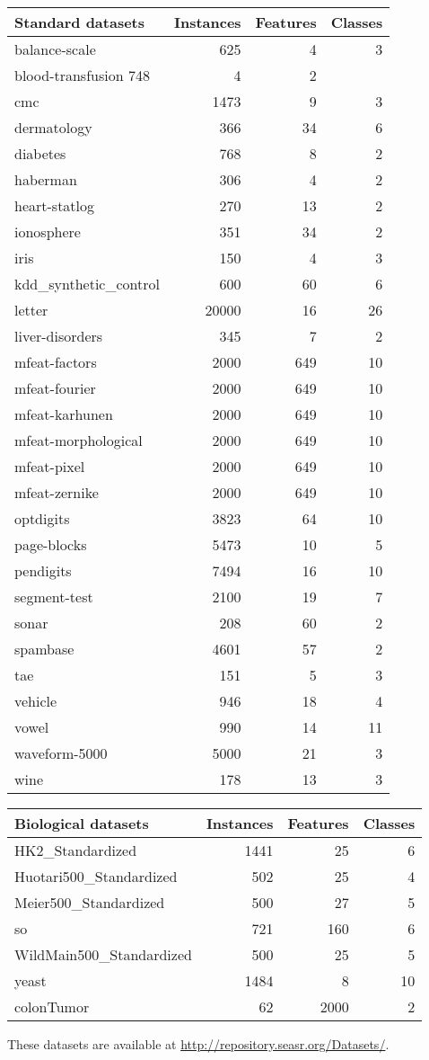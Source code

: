 \begin{tabularx}{\textwidth}{X r r r}
\bf Standard datasets& \bf Instances & \bf Features & \bf Classes\\
\hline

balance-scale & 625 & 4 & 3\\
blood-transfusion  748 & 4 & 2\\
cmc & 1473 & 9 & 3\\
dermatology & 366 & 34 & 6 \\
diabetes & 768 & 8 & 2\\
haberman & 306 & 4 & 2\\
heart-statlog & 270 & 13 & 2 \\
ionosphere & 351 & 34 & 2\\
iris & 150 & 4 & 3\\
kdd\_synthetic\_control & 600 & 60 & 6\\
letter & 20000 & 16 & 26\\
liver-disorders & 345 & 7 & 2 \\
mfeat-factors & 2000 & 649 & 10 \\
mfeat-fourier & 2000 & 649 & 10 \\
mfeat-karhunen & 2000 & 649 & 10 \\
mfeat-morphological  & 2000 & 649 & 10 \\
mfeat-pixel & 2000 & 649 & 10 \\
mfeat-zernike  & 2000 & 649 & 10 \\
optdigits & 3823 & 64 & 10 \\
page-blocks & 5473 & 10 & 5 \\
pendigits & 7494 & 16 & 10 \\
segment-test & 2100 & 19 & 7\\
sonar & 208 & 60 & 2\\
spambase & 4601 & 57 & 2\\
tae & 151 & 5 & 3 \\
vehicle & 946 & 18 & 4\\
vowel & 990 & 14 & 11 \\
waveform-5000 & 5000 & 21 & 3\\
wine & 178 & 13 & 3 \\
\end{tabularx}
\clearpage

\begin{tabularx}{\textwidth}{X r r r}
\bf Biological datasets& \bf Instances & \bf Features & \bf Classes\\
\hline
HK2\_Standardized & 1441 & 25 & 6 \\
Huotari500\_Standardized & 502 & 25 & 4 \\
Meier500\_Standardized & 500 & 27 & 5 \\
so & 721 & 160 & 6\\
WildMain500\_Standardized & 500 & 25 & 5 \\
yeast & 1484 & 8 & 10 \\
colonTumor & 62 & 2000 & 2\\
\end{tabularx}

These datasets are available at \url{http://repository.seasr.org/Datasets/}.
